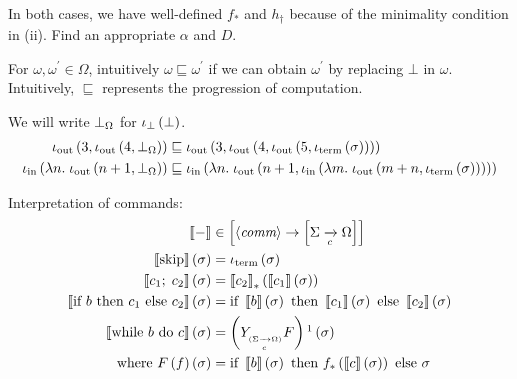 \begin{enumcirc}
\begin{enumrm}
\begin{align*}
		\end{align*}
		\begin{exercise}
			In both cases, we have well-defined $f_*$ and $h_\dagger$ because of the minimality condition in (ii).
			Find an appropriate $\alpha$ and $D$.
		\end{exercise}
		\item
		For $\omega, \omega^\prime \in \Omega$,
		intuitively $\omega \sqsubseteq \omega^\prime$ if we can obtain $\omega^\prime$
		by replacing $\bot$ in $\omega$.
		Intuitively, $\sqsubseteq$ represents the progression of computation.
		\begin{example}
			We will write $\bot_\Omega$ for $\iota_\bot\left( \bot \right)$.
			\begin{align*}
				\iota_{\textrm{out}} \left( 3, \iota_{\textrm{out}}\left( 4, \bot_\Omega \right) \right) \sqsubseteq\;             &
				\iota_{\textrm{out}}\left( 3, \iota_{\textrm{out}}\left( 4, \iota_{\textrm{out}}\left( 5, \iota_{\textrm{term}}\left( \sigma \right) \right) \right) \right) \\
				\iota_{\textrm{in}} \left( \lambda n.\; \iota_{\textrm{out}}\left( n+1,  \bot_\Omega \right) \right) \sqsubseteq\; &
				\iota_{\textrm{in}}\left( \lambda n.\; \iota_{\textrm{out}}\left( n+1, \iota_{\textrm{in}}\left( \lambda m.\; \iota_{\textrm{out}}\left( m+n, \iota_{\textrm{term}}\left( \sigma \right) \right) \right) \right) \right)
			\end{align*}
		\end{example}
	\end{enumrm}
	\item
	Interpretation of commands:
	\begin{align*}
		\bbrackets{-}                                & \in
		\brackets{\chevrons{\textit{comm}} \to \brackets{\Sigma \toc \Omega}}                              \\
		\bbrackets{\cskip} \prths{\sigma}            & =
		\iterm\prths{\sigma}                                                                               \\
		\bbrackets{\cseq{c_1}{c_2}} \prths{\sigma}   & =
		\bbrackets{c_2}_* \prths{\bbrackets{c_1} \prths{\sigma}}                                           \\
		\bbrackets{\cif{b}{c_1}{c_2}} \prths{\sigma} & =
		\cif{\bbrackets{b} \prths{\sigma}}{\bbrackets{c_1} \prths{\sigma}}{\bbrackets{c_2} \prths{\sigma}} \\
		\bbrackets{\cwhile{b}{c}} \prths{\sigma}     & =
		\prths{\subscmath{Y}{(\Sigma \toc \Omega)} F}\footnotemark \prths{\sigma}                          \\
		\textrm{where } F\prths{f}\prths{\sigma}     & =
		\cif{\bbrackets{b} \prths{\sigma}}{f_*\prths{\bbrackets{c} \prths{\sigma}}}{\sigma}                \\

\end{align*}
\end{enumcirc}
